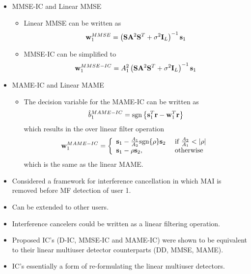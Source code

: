 \documentclass[25pt,landscape]{foils}
\newcommand{\br}{{\mathbf r}}
\newcommand{\bA}{{\mathbf A}}
\newcommand{\bs}{{\bf s}}
\newcommand{\bw}{{\bf w}}
\newcommand{\bS}{{\bf S}}
\newcommand{\bI}{{\bf I}}
\begin{document}
\begin{itemize}
\zerolistvertdimens
\item MMSE-IC and Linear MMSE
 \begin{itemize}
 \item Linear MMSE can be written as \vspace{-.2in}
 $$
 \bw_{1}^{MMSE} = \left( \bS \bA^{2} \bS^{T} + \sigma^{2} \bI_{L} \right)^{-1} \bs_{1} \vspace{-.2in}
 $$
 \item MMSE-IC can be simplified to \vspace{-.2in}
 $$
 \bw_{1}^{MMSE-IC} = A_{1}^{2} \left( \bS \bA^{2} \bS^{T} + \sigma^{2} \bI_{L} \right)^{-1} \bs_{1} \vspace{-.2in}
 $$
 \end{itemize}
\item MAME-IC and Linear MAME
 \begin{itemize}
 \item The decision variable for the MAME-IC can be written as \vspace{-.2in}
 $$
 \hat{b}_{1}^{MAME-IC} = \mbox{sgn} \left\{ \bs_{1}^{T} \br -
 \bw_{1}^{T} \br \right\} \vspace{-.2in}
 $$
 which results in the over linear filter operation  \vspace{-.2in}
 $$
 \bw_{1}^{MAME-IC} = \left\{ \begin{array}{ll} \bs_{1} -
 \frac{A_{1}}{A_{2}} \mbox{sgn}\{\rho\} \bs_{2} &  \mbox{ if }
 \frac{A_{2}}{A_{1}} < |\rho| \\ \bs_{1} - \rho \bs_{2}, & \mbox{
 otherwise} \end{array} \right. \vspace{-.2in}
 $$
 which is the same as the linear MAME.
 \end{itemize}
\end{itemize}


\begin{itemize}
\item Considered a framework for interference cancellation in which MAI is
removed before MF detection of user 1.
\item Can be extended to other users.
\item Interference cancelers could be written as a linear filtering
operation.
\item Proposed IC's (D-IC, MMSE-IC and MAME-IC) were shown to be equivalent
to their linear multiuser detector counterparts (DD, MMSE, MAME).
\item IC's essentially a form of re-formulating the linear multiuser
detectors.
\end{itemize}
\end{document}
